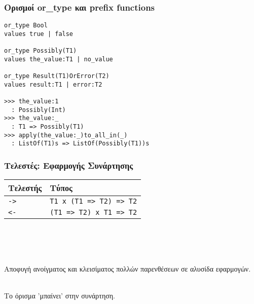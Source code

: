 \documentclass{beamer}
\def\e{\foreignlanguage{english}}
\begin{document}
\begin{frame}[fragile]

\frametitle{Ορισμοί \e{or\_type} και \e{prefix functions}}


\begin{otherlanguage}{english}
\begin{verbatim}
or_type Bool
values true | false

or_type Possibly(T1)
values the_value:T1 | no_value

or_type Result(T1)OrError(T2)
values result:T1 | error:T2

>>> the_value:1
  : Possibly(Int)
>>> the_value:_
  : T1 => Possibly(T1)
>>> apply(the_value:_)to_all_in(_)
  : ListOf(T1)s => ListOf(Possibly(T1))s

\end{verbatim}
\end{otherlanguage}

\end{frame}

\begin{frame}[fragile]

\frametitle{Τελεστές: Εφαρμογής Συνάρτησης}

\begin{center}
\begin{tabular}{ |P{2cm}|P{5cm}| }
 \hline
 Τελεστής & Τύπος
 \\
 \hline
 \e{\texttt{->}} & \e{\texttt{T1 x (T1 => T2) => T2}}
 \\
 \e{\texttt{<-}} & \e{\texttt{(T1 => T2) x T1 => T2}}
 \\
 \hline
\end{tabular}
\\~\
\\~\
\end{center}

Αποφυγή ανοίγματος και κλεισίματος πολλών παρενθέσεων σε αλυσίδα εφαρμογών.
\\~\

Το όρισμα 'μπαίνει' στην συνάρτηση.
\end{frame}
\end{document}
